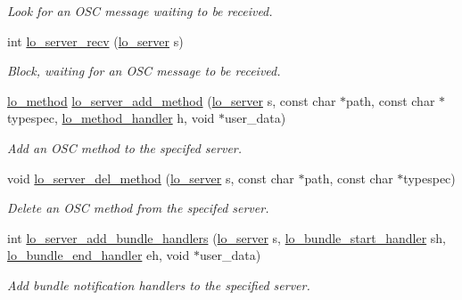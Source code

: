 \begin{DoxyCompactItemize}
\begin{DoxyCompactList}\small\item\em Look for an O\+S\+C message waiting to be received. \end{DoxyCompactList}\item 
int \hyperlink{group__liblolowlevel_gaebef3611d24e4b5f60f16cce76a9e271}{lo\+\_\+server\+\_\+recv} (\hyperlink{lo__types_8h_a59067bf50cf8abb4371da6f03c9036c9}{lo\+\_\+server} s)
\begin{DoxyCompactList}\small\item\em Block, waiting for an O\+S\+C message to be received. \end{DoxyCompactList}\item 
\hyperlink{lo__types_8h_a66faedf5da13231d8c0166870477dce5}{lo\+\_\+method} \hyperlink{group__liblolowlevel_ga0c183cabaac67eb9aad3265ae1efa580}{lo\+\_\+server\+\_\+add\+\_\+method} (\hyperlink{lo__types_8h_a59067bf50cf8abb4371da6f03c9036c9}{lo\+\_\+server} s, const char $\ast$path, const char $\ast$typespec, \hyperlink{lo__types_8h_a3b1c86c0925d05e13b5438ce8fe80a6c}{lo\+\_\+method\+\_\+handler} h, void $\ast$user\+\_\+data)
\begin{DoxyCompactList}\small\item\em Add an O\+S\+C method to the specifed server. \end{DoxyCompactList}\item 
void \hyperlink{group__liblolowlevel_gaf834a6d62de7dcceaede62325e74c763}{lo\+\_\+server\+\_\+del\+\_\+method} (\hyperlink{lo__types_8h_a59067bf50cf8abb4371da6f03c9036c9}{lo\+\_\+server} s, const char $\ast$path, const char $\ast$typespec)
\begin{DoxyCompactList}\small\item\em Delete an O\+S\+C method from the specifed server. \end{DoxyCompactList}\item 
int \hyperlink{group__liblolowlevel_ga1411fdb0c8037a4dd3ab19af35df50ac}{lo\+\_\+server\+\_\+add\+\_\+bundle\+\_\+handlers} (\hyperlink{lo__types_8h_a59067bf50cf8abb4371da6f03c9036c9}{lo\+\_\+server} s, \hyperlink{lo__types_8h_a40484ab2ebc1413ffe465558a638d329}{lo\+\_\+bundle\+\_\+start\+\_\+handler} sh, \hyperlink{lo__types_8h_a3074807a4e7379c1b101c303567b7e42}{lo\+\_\+bundle\+\_\+end\+\_\+handler} eh, void $\ast$user\+\_\+data)
\begin{DoxyCompactList}\small\item\em Add bundle notification handlers to the specified server. \end{DoxyCompactList}\item 

\end{DoxyCompactItemize}
